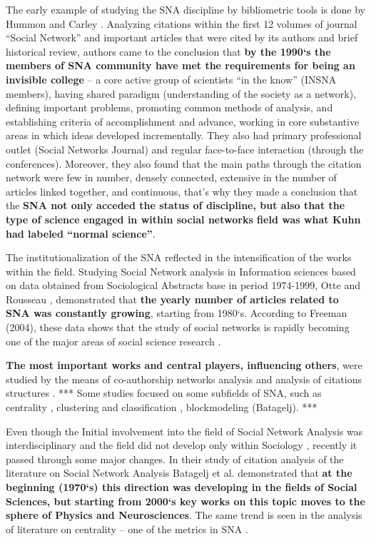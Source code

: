 \documentclass[11pt]{article} %
\newcommand{\Remark}[1]{\ifodd\value{page} \normalmarginpar
 \else \reversemarginpar \fi \marginpar{{\footnotesize #1}} }
\begin{document}
The early example of studying the SNA discipline by bibliometric tools is done by Hummon and Carley \citep{normSci}. Analyzing citations within the first 12 volumes of journal “Social Network” and important articles that were cited by its authors and brief historical review, authors came to the conclusion that \textbf{by the 1990`s the members of SNA community have met the requirements for being an invisible college} – a core active group of scientists “in the know” (INSNA members), having shared paradigm (understanding of the society as a network), defining important problems, promoting common methods of analysis, and establishing criteria of accomplishment and advance, working in core substantive areas in which ideas developed incrementally. They also had primary professional outlet (Social Networks Journal) and regular face-to-face interaction (through the conferences). Moreover, they also found that the main paths through the citation network were few in number, densely connected, extensive in the number of articles linked together, and continuous, that’s why they made a conclusion that the \textbf{SNA not only acceded the status of discipline, but also that the type of science engaged in within social networks field was what Kuhn had labeled “normal science”}.\medskip 

The institutionalization of the SNA reflected in the intensification of the works within the field. Studying Social Network analysis in Information sciences based on data obtained from Sociological Abstracts base in period 1974-1999, Otte and Rousseau \citep{SNAinf}, demonstrated that \textbf{the yearly number of articles related to SNA was constantly growing}, starting from 1980`s. According to Freeman (2004), these data shows that the study of social networks is rapidly becoming one of the major areas of social science research  \citep{SNAdev}.  \medskip 

\textbf{The most important works and central players, influencing others}, were studied by the means of co-authorship networks analysis \citep{SNAinf,leydes} and analysis of citations structures \citep{normSci,Understand}. *** \Remark{What was found}  Some studies focused on some subfields of SNA, such as centrality \citep{Understand}, clustering and classification \citep{kejzar}, blockmodeling (Batagelj). ***  \Remark{What was found} \medskip 

Even though the Initial involvement into the field of Social Network Analysis was interdisciplinary \citep{normSci} and the field did not develop only within Sociology \citep{SNAinf}, recently it passed through some major changes. In their study of citation analysis of the literature on Social Network Analysis Batagelj et al. \citep{Understand} demonstrated that \textbf{at the beginning (1970`s) this direction was developing in the fields of Social Sciences, but starting from 2000`s key works on this topic moves to the sphere of Physics and Neurosciences}. The same trend is seen in the analysis of literature on centrality -- one of the metrics in SNA \citep{Understand}. \medskip  
 
\end{document}
